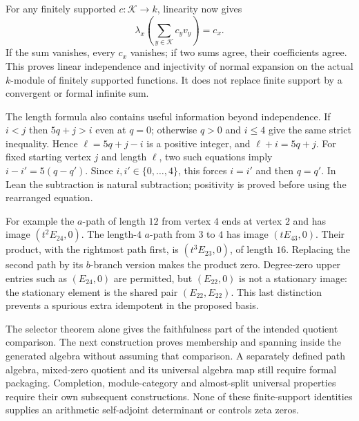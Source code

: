 \documentclass[11pt]{article}
\theoremstyle{definition}\newtheorem{definition}[theorem]{Definition}
\theoremstyle{remark}\newtheorem{remark}[theorem]{Remark}
\begin{document}
For any finitely supported $c:\mathcal K\to k$, linearity now gives
\[
 \lambda_x\left(\sum_{y\in\mathcal K}c_yv_y\right)=c_x.
\]
If the sum vanishes, every $c_x$ vanishes; if two sums agree, their
coefficients agree. This proves linear independence and injectivity of
normal expansion on the actual $k$-module of finitely supported functions.
It does not replace finite support by a convergent or formal infinite sum.

The length formula also contains useful information beyond independence.
If $i<j$ then $5q+j>i$ even at $q=0$; otherwise $q>0$ and $i\leq4$ give
the same strict inequality. Hence $\ell=5q+j-i$ is a positive integer,
and $\ell+i=5q+j$. For fixed starting vertex $j$ and length $\ell$,
two such equations imply $i-i'=5(q-q')$. Since $i,i'\in\{0,\ldots,4\}$,
this forces $i=i'$ and then $q=q'$. In Lean the subtraction is natural
subtraction; positivity is proved before using the rearranged equation.

For example the $a$-path of length $12$ from vertex $4$ ends at vertex
$2$ and has image $(t^2E_{24},0)$. The length-$4$ $a$-path from $3$ to
$4$ has image $(tE_{43},0)$. Their product, with the rightmost path first,
is $(t^3E_{23},0)$, of length $16$. Replacing the second path by its
$b$-branch version makes the product zero. Degree-zero upper entries such
as $(E_{24},0)$ are permitted, but $(E_{22},0)$ is not a stationary image:
the stationary element is the shared pair $(E_{22},E_{22})$. This last
distinction prevents a spurious extra idempotent in the proposed basis.

The selector theorem alone gives the faithfulness part of the intended
quotient comparison. The next construction proves membership and spanning
inside the generated algebra without assuming that comparison. A separately
defined path algebra, mixed-zero quotient and its universal algebra map
still require formal packaging. Completion, module-category and almost-split
universal properties require their own subsequent constructions. None of
these finite-support identities supplies an arithmetic self-adjoint
determinant or controls zeta zeros.
\end{document}
